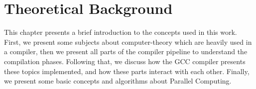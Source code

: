\chapter{Theoretical Background}
\label{chap:fundamentacao}

This chapter presents a brief introduction to the concepts used in this work.
First, we present some subjects about computer-theory which are heavily
used in a compiler, then we present all parts of the compiler pipeline
to understand the compilation phases. Following that, we discuss how the
GCC compiler presents these topics implemented, and how these parts interact
with each other.  Finally, we present some basic concepts and algorithms about
Parallel Computing.



